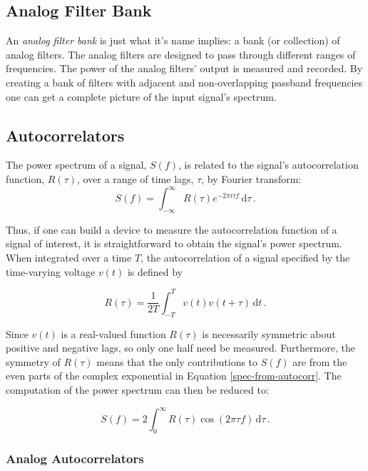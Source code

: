 \documentclass{article}
\begin{document}
\subsection{Analog Filter Bank}\label{analog-filter-bank}

An \emph{analog filter bank} is just what it's name implies: a bank (or
collection) of analog filters. The analog filters are designed to pass
through different ranges of frequencies. The power of the analog
filters' output is measured and recorded. By creating a bank of filters
with adjacent and non-overlapping passband frequencies one can get a
complete picture of the input signal's spectrum.

\subsection{Autocorrelators}\label{autocorrelators}
The power spectrum of a signal, $S(f)$,  is related to the signal's autocorrelation function, $R(\tau)$, over a range of time lags, $\tau$, by Fourier transform:
\begin{equation}
\label{spec-from-autocorr}
 S(f) = \int_{-\infty}^{\infty} R(\tau)e^{-2\pi i \tau f} \,\mathrm{d}\tau \,.
\end{equation}

Thus, if one can build a device to measure the autocorrelation function of a signal of interest, it is straightforward to obtain the signal's power spectrum.
When integrated over a time $T$, the autocorrelation of a signal specified by the time-varying voltage $v(t)$ is defined by 

\begin{equation}
\label{autocorr}
 R(\tau) = \frac{1}{2T} \int_{-T}^{T} v(t)v(t+\tau) \,\mathrm{d}t \,.
\end{equation}

Since $v(t)$ is a real-valued function $R(\tau)$ is necessarily symmetric about positive and negative lags, so only one half need be measured. Furthermore, the symmetry of $R(\tau)$ means that the only contributions to $S(f)$ are from the even parts of the complex exponential in Equation \ref{spec-from-autocorr}. The computation of the power spectrum can then be reduced to:

\begin{equation}
\label{spec-from-autocorr-reduced}
 S(f) = 2\int_{0}^{\infty} R(\tau)\cos{(2\pi \tau f)} \,\mathrm{d}\tau \,.
\end{equation}


\subsubsection{Analog Autocorrelators}\label{analog-autocorrelators}
\end{document}
